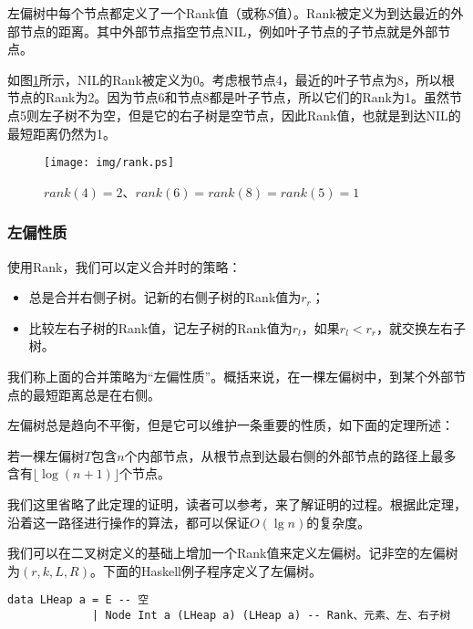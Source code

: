 \documentclass[UTF8]{article}
\begin{document}
左偏树中每个节点都定义了一个Rank值（或称$S$值）。Rank被定义为到达最近的外部节点的距离。其中外部节点指空节点NIL，例如叶子节点的子节点就是外部节点。

如图\ref{fig:rank}所示，NIL的Rank被定义为0。考虑根节点4，最近的叶子节点为8，所以根节点的Rank为2。因为节点6和节点8都是叶子节点，所以它们的Rank为1。虽然节点5则左子树不为空，但是它的右子树是空节点，因此Rank值，也就是到达NIL的最短距离仍然为1。

\begin{figure}[htbp]
   \begin{center}
     \texttt{[image: img/rank.ps]}
     \caption{$rank(4) = 2$、$rank(6) = rank(8) = rank(5) = 1$} \label{fig:rank}
   \end{center}
\end{figure}

\subsubsection{左偏性质}

使用Rank，我们可以定义合并时的策略：

\begin{itemize}
\item 总是合并右侧子树。记新的右侧子树的Rank值为$r_r$；
\item 比较左右子树的Rank值，记左子树的Rank值为$r_l$，如果$r_l < r_r$，就交换左右子树。
\end{itemize}

我们称上面的合并策略为“左偏性质”。概括来说，在一棵左偏树中，到某个外部节点的最短距离总是在右侧。

左偏树总是趋向不平衡，但是它可以维护一条重要的性质，如下面的定理所述：

\begin{theorem}
若一棵左偏树$T$包含$n$个内部节点，从根节点到达最右侧的外部节点的路径上最多含有$\lfloor \log (n+1) \rfloor$个节点。
\end{theorem}

我们这里省略了此定理的证明，读者可以参考\cite{brono-book}，\cite{TAOCP-bheap}来了解证明的过程。根据此定理，沿着这一路径进行操作的算法，都可以保证$O(\lg n)$的复杂度。

我们可以在二叉树定义的基础上增加一个Rank值来定义左偏树。记非空的左偏树为$(r, k, L, R)$。下面的Haskell例子程序定义了左偏树。

\lstset{language=Haskell}
\begin{lstlisting}[style=Haskell]
data LHeap a = E -- 空
             | Node Int a (LHeap a) (LHeap a) -- Rank、元素、左、右子树
\end{lstlisting}
\end{document}
